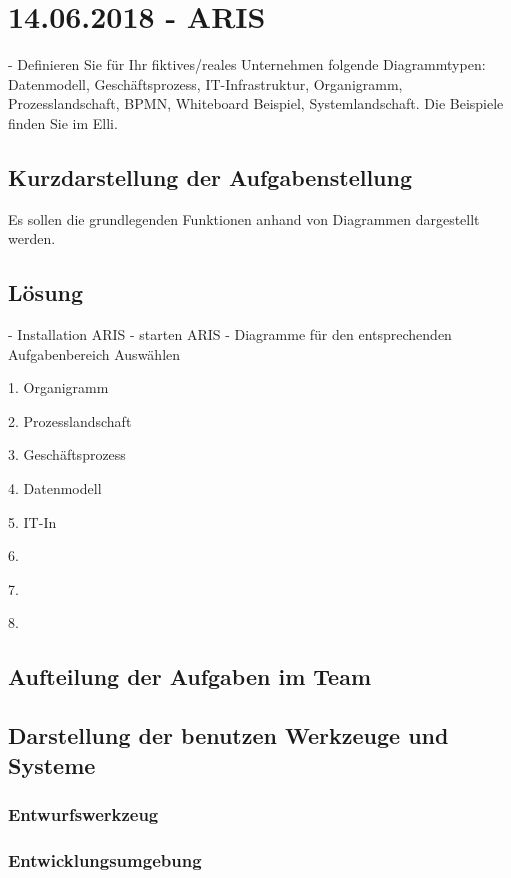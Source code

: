 \section{14.06.2018 - ARIS}
- Definieren Sie für Ihr fiktives/reales Unternehmen folgende Diagrammtypen: Datenmodell, Geschäftsprozess, IT-Infrastruktur, Organigramm, Prozesslandschaft, BPMN, Whiteboard Beispiel, Systemlandschaft. Die Beispiele finden Sie im Elli.

\subsection*{Kurzdarstellung der Aufgabenstellung}
Es sollen die grundlegenden Funktionen anhand von Diagrammen dargestellt werden.
\subsection*{Lösung}
- Installation ARIS
- starten ARIS
- Diagramme für den entsprechenden Aufgabenbereich Auswählen

1. Organigramm

2. Prozesslandschaft

3. Geschäftsprozess

4. Datenmodell

5. IT-In

6.

7.

8.

\subsection*{Aufteilung der Aufgaben im Team}
\subsection*{Darstellung der benutzen Werkzeuge und Systeme}
\subsubsection*{Entwurfswerkzeug}
\subsubsection*{Entwicklungsumgebung}

